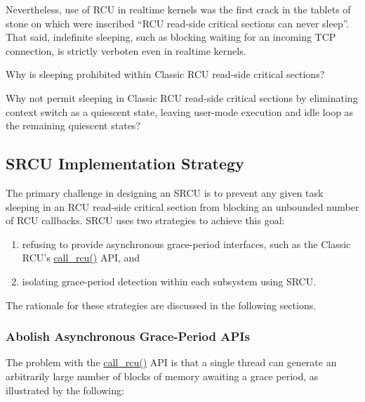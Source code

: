Nevertheless,
use of RCU in realtime kernels was the first crack in the tablets
of stone on which were inscribed ``RCU read-side critical sections can never
sleep''.
That said, indefinite sleeping, such as blocking waiting for an
incoming TCP connection, is strictly verboten even in realtime kernels.

\QuickQuiz{}
	Why is sleeping prohibited within Classic RCU read-side
	critical sections?
 \QuickQuizEnd

\QuickQuiz{}
	Why not permit sleeping in Classic RCU read-side critical sections
	by eliminating context switch as a quiescent state, leaving user-mode
	execution and idle loop as the remaining quiescent states?
 \QuickQuizEnd

\subsection{SRCU Implementation Strategy}
\label{sec:app:rcuimpl:SRCU Implementation Strategy}

The primary challenge in designing an SRCU
is to prevent any given task sleeping in an RCU read-side
critical section from blocking an unbounded number of RCU callbacks.
SRCU uses two strategies to achieve this goal:
\begin{enumerate}
\item	refusing to provide asynchronous grace-period interfaces,
	such as the Classic RCU's \url{call_rcu()} API, and
\item	isolating grace-period detection within each subsystem using SRCU.
\end{enumerate}
The rationale for these strategies are discussed in the following sections.

\subsubsection{Abolish Asynchronous Grace-Period APIs}
\label{sec:app:rcuimpl:Abolish Asynchronous Grace-Period APIs}

The problem with the \url{call_rcu()} API is that a single thread can
generate an arbitrarily large number of blocks of memory awaiting a
grace period, as illustrated by the following:

